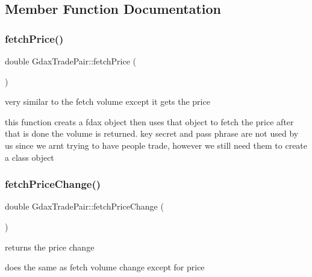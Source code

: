 \subsection{Member Function Documentation}
\mbox{\label{class_gdax_trade_pair_adacd391af9a85002ae707c374a1ad17c}} 
\subsubsection{\texorpdfstring{fetch\+Price()}{fetchPrice()}}
{\footnotesize\ttfamily double Gdax\+Trade\+Pair\+::fetch\+Price (\begin{DoxyParamCaption}{ }\end{DoxyParamCaption})}



very similar to the fetch volume except it gets the price 

this function creats a fdax object then uses that object to fetch the price after that is done the volume is returned. key secret and pass phrase are not used by us since we arnt trying to have people trade, however we still need them to create a class object \mbox{\label{class_gdax_trade_pair_af6c2de9262607777c2fc22d25b700fc6}} 
\subsubsection{\texorpdfstring{fetch\+Price\+Change()}{fetchPriceChange()}}
{\footnotesize\ttfamily double Gdax\+Trade\+Pair\+::fetch\+Price\+Change (\begin{DoxyParamCaption}{ }\end{DoxyParamCaption})}



returns the price change 

does the same as fetch volume change except for price \mbox{\label{class_gdax_trade_pair_ad7799585f8c7e06792da997cc53966b5}} 
